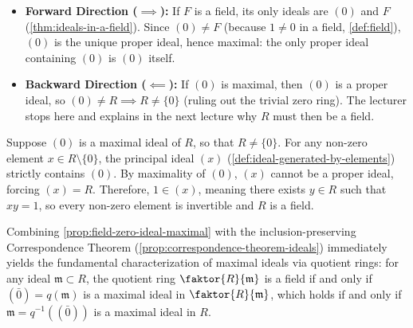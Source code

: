 \begin{content}

\begin{steps}
\begin{itemize}
    \item \textbf{Forward Direction ($\implies$):} If $F$ is a field, its only ideals are $(0)$ and $F$ (\cref{thm:ideals-in-a-field}). Since $(0) \neq F$ (because $1 \neq 0$ in a field, \cref{def:field}), $(0)$ is the unique proper ideal, hence maximal: the only proper ideal containing $(0)$ is $(0)$ itself.
    \item \textbf{Backward Direction ($\impliedby$):} If $(0)$ is maximal, then $(0)$ is a proper ideal, so $(0) \neq R \implies R \neq \{0\}$ (ruling out the trivial zero ring). The lecturer stops here and explains in the next lecture why $R$ must then be a field.
\end{itemize}
\end{steps}
\end{content}

\begin{aiNote}
Suppose $(0)$ is a maximal ideal of $R$, so that $R \neq \{0\}$. For any non-zero element $x \in R \setminus \{0\}$, the principal ideal $(x)$ (\cref{def:ideal-generated-by-elements}) strictly contains $(0)$. By maximality of $(0)$, $(x)$ cannot be a proper ideal, forcing $(x) = R$. Therefore, $1 \in (x)$, meaning there exists $y \in R$ such that $x y = 1$, so every non-zero element is invertible and $R$ is a field.

Combining \cref{prop:field-zero-ideal-maximal} with the inclusion-preserving Correspondence Theorem (\cref{prop:correspondence-theorem-ideals}) immediately yields the fundamental characterization of maximal ideals via quotient rings: for any ideal $\mathfrak{m} \subset R$, the quotient ring $\faktor{R}{\mathfrak{m}}$ is a field if and only if $(\bar{0}) = q(\mathfrak{m})$ is a maximal ideal in $\faktor{R}{\mathfrak{m}}$, which holds if and only if $\mathfrak{m} = q^{-1}((\bar{0}))$ is a maximal ideal in $R$.
\end{aiNote}


